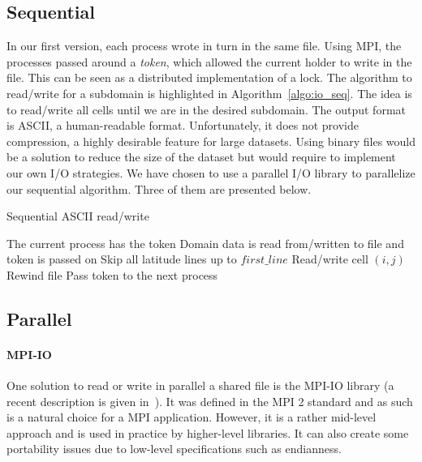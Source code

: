 \subsection{Sequential}
In our first version, each process wrote in turn in the same file. Using MPI,
the processes passed around a \textit{token}, which allowed the current holder
to write in the file. This can be seen as a distributed implementation of a lock.
The algorithm to read/write for a subdomain is highlighted in
Algorithm~\ref{algo:io_seq}. The idea is to read/write all cells until we
are in the desired subdomain.
The output format is ASCII, a human-readable format. Unfortunately, it does not
provide compression, a highly desirable feature for large datasets. Using binary files would
be a solution to reduce the size of the dataset but would require to implement
our own I/O strategies. We have chosen to use a parallel I/O library to
parallelize our sequential algorithm. Three of them are presented below.

\begin{algorithm}
  \caption{Sequential ASCII read/write}
\label{algo:io_seq}
  \begin{algorithmic}
    \Require The current process has the token
    \Ensure Domain data is read from/written to file and token is passed on
    \State Skip all latitude lines up to $first\_line$
          \State Read/write cell $(i,j)$
        \EndIf
      \EndFor
    \EndFor
    \State Rewind file
    \State Pass token to the next process
  \end{algorithmic}
\end{algorithm}

\subsection{Parallel}
\paragraph{MPI-IO}
One solution to read or write in parallel a shared file is the MPI-IO
library (a recent description is given in~\cite{Liao2014}). It was defined in
the MPI 2 standard and as such is a natural choice for a MPI application.
However, it is a rather mid-level approach and is used in practice by
higher-level libraries. It can also create some portability issues due to
low-level specifications such as \gls{endianness}.


